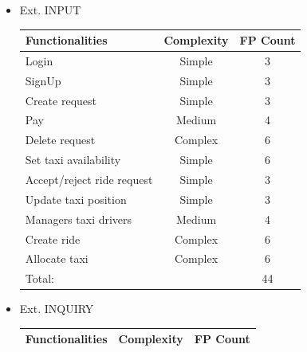 \documentclass[a4paper,11pt]{report} %
\begin{document}
\begin{itemize}
\begin{center}
\begin{tabular}{| p{7cm} | p{2.5cm} | p{2cm} |}
					\end{tabular}
				\end{center}
				\item Ext. INPUT
				\renewcommand{\arraystretch}{1.2}
				\setlength{\tabcolsep}{12pt}
				\begin{center}
					\begin{tabular}{| p{7cm} | p{2.5cm} | p{2cm} |}\hline
						\textbf{Functionalities} & \multicolumn{1}{|c|}{\textbf{Complexity}} & \textbf{FP Count}\\\hline
						Login & \multicolumn{1}{|c|}{Simple} & \multicolumn{1}{|c|}{3}\\\hline
						SignUp & \multicolumn{1}{|c|}{Simple} & \multicolumn{1}{|c|}{3}\\\hline
						Create request & \multicolumn{1}{|c|}{Simple} & \multicolumn{1}{|c|}{3}\\\hline					
						Pay & \multicolumn{1}{|c|}{Medium} & \multicolumn{1}{|c|}{4}\\\hline		
						Delete request & \multicolumn{1}{|c|}{Complex} & \multicolumn{1}{|c|}{6}\\\hline	
						Set taxi availability & \multicolumn{1}{|c|}{Simple} & \multicolumn{1}{|c|}{6}\\\hline					
						Accept/reject ride request & \multicolumn{1}{|c|}{Simple} & \multicolumn{1}{|c|}{3}\\\hline			
						Update taxi position & \multicolumn{1}{|c|}{Simple} & \multicolumn{1}{|c|}{3}\\\hline				
						Managers taxi drivers & \multicolumn{1}{|c|}{Medium} & \multicolumn{1}{|c|}{4}\\\hline				
						Create ride & \multicolumn{1}{|c|}{Complex} & \multicolumn{1}{|c|}{6}\\\hline		
						Allocate taxi & \multicolumn{1}{|c|}{Complex} & \multicolumn{1}{|c|}{6}\\\hline																																																												
						\multicolumn{2}{|l|}{Total:} & \multicolumn{1}{|c|}{44}\\\hline
					\end{tabular}
				\end{center}
				\item Ext. INQUIRY
				\renewcommand{\arraystretch}{1.2}
				\setlength{\tabcolsep}{12pt}
				\begin{center}
					\begin{tabular}{| p{7cm} | p{2.5cm} | p{2cm} |}\hline
						\textbf{Functionalities} & \multicolumn{1}{|c|}{\textbf{Complexity}} & \textbf{FP Count}\\\hline

\end{tabular}
\end{center}
\end{itemize}
\end{document}
